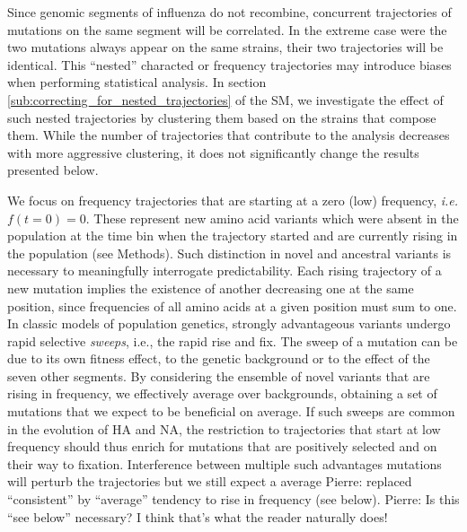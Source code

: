 \documentclass[reprint,amsmath,amssymb,superscriptaddress,showpacs,rmp]{revtex4-1}
\newcommand{\pierre}[1]{{\color{red}Pierre: #1}}
\begin{document}
Since genomic segments of influenza do not recombine, concurrent trajectories of mutations on the same segment will be correlated.
In the extreme case were the two mutations always appear on the same strains, their two trajectories will be identical.
This ``nested'' characted or frequency trajectories may introduce biases when performing statistical analysis.
In section \ref{sub:correcting_for_nested_trajectories} of the SM, we investigate the effect of such nested trajectories by clustering them based on the strains that compose them.
While the number of trajectories that contribute to the analysis decreases with more aggressive clustering, it does not significantly change the results presented below.

We focus on frequency trajectories that are starting at a zero (low) frequency, \emph{i.e.} $f(t=0)=0$.
These represent new amino acid variants which were absent in the population at the time bin when the trajectory started and are currently rising in the population (see Methods).
Such distinction in novel and ancestral variants is necessary to meaningfully interrogate predictability.
Each rising trajectory of a new mutation implies the existence of another decreasing one at the same position, since frequencies of all amino acids at a given position must sum to one.
In classic models of population genetics, strongly advantageous variants undergo rapid selective \emph{sweeps}, i.e., the rapid rise and fix.
The sweep of a mutation can be due to its own fitness effect, to the genetic background or to the effect of the seven other segments.
By considering the ensemble of novel variants that are rising in frequency, we effectively average over backgrounds, obtaining a set of mutations that we expect to be beneficial on average.
If such sweeps are common in the evolution of HA and NA, the restriction to trajectories that start at low frequency should thus enrich for mutations that are positively selected and on their way to fixation.
Interference between multiple such advantages mutations will perturb the trajectories \citep{illingworth_components_2012} but we still expect a average \pierre{replaced ``consistent'' by ``average''} tendency to rise in frequency (see below). \pierre{Is this ``see below'' necessary? I think that's what the reader naturally does! }
\end{document}
